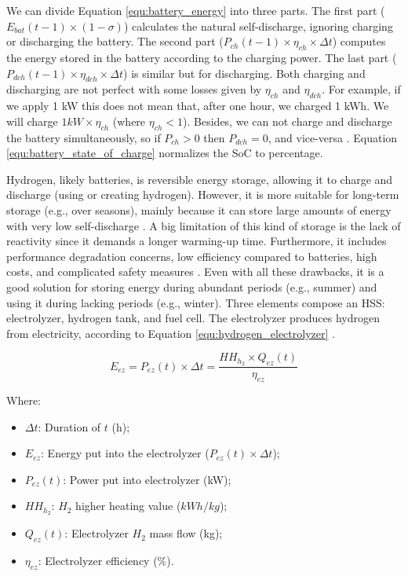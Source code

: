 We can divide Equation \ref{equ:battery_energy} into three parts. The first part ($E_{bat}(t-1) \times (1 - \sigma)$) calculates the natural self-discharge, ignoring charging or discharging the battery. The second part ($P_{ch}(t-1) \times \eta_{ch} \times \Delta t$) computes the energy stored in the battery according to the charging power. The last part ($P_{dch}(t-1) \times \eta_{dch} \times \Delta t$) is similar but for discharging. Both charging and discharging are not perfect with some losses given by $\eta_{ch}$ and $\eta_{dch}$. For example, if we apply 1 kW this does not mean that, after one hour, we charged 1 kWh. We will charge $1 kW \times \eta_{ch}$ (where $\eta_{ch} < 1$). Besides, we can not charge and discharge the battery simultaneously, so if $P_{ch} > 0$ then $P_{dch} = 0$, and vice-versa \cite{haddad2019mixed}. Equation \ref{equ:battery_state_of_charge} normalizes the SoC to percentage.

Hydrogen, likely batteries, is reversible energy storage, allowing it to charge and discharge (using or creating hydrogen). However, it is more suitable for long-term storage (e.g., over seasons), mainly because it can store large amounts of energy with very low self-discharge \cite{pregger2009prospects}. A big limitation of this kind of storage is the lack of reactivity since it demands a longer warming-up time. Furthermore, it includes performance degradation concerns, low efficiency compared to batteries, high costs, and complicated safety measures \cite{rostirolla2022survey}. Even with all these drawbacks, it is a good solution for storing energy during abundant periods (e.g., summer) and using it during lacking periods (e.g., winter). Three elements compose an HSS: electrolyzer, hydrogen tank, and fuel cell. The electrolyzer produces hydrogen from electricity, according to Equation \ref{equ:hydrogen_electrolyzer} \cite{haddad2019mixed}.

\begin{equation}
    \label{equ:hydrogen_electrolyzer}
    E_{ez} = P_{ez}(t) \times \Delta t = \frac{HH_{h_{2}} \times Q_{ez}(t)}{\eta_{ez}}
\end{equation}

Where:
\begin{itemize}
    \item $\Delta t$: Duration of $t$ (h);
    \item $E_{ez}$: Energy put into the electrolyzer ($P_{ez}(t) \times \Delta t$);
    \item $P_{ez}(t)$: Power put into electrolyzer (kW);
    \item $HH_{h_{2}}$: $H_2$ higher heating value ($kWh / kg$);
    \item $Q_{ez}(t)$: Electrolyzer $H_2$ mass flow (kg);
    \item $\eta_{ez}$: Electrolyzer efficiency (\%).
\end{itemize}


